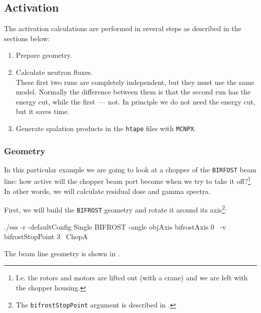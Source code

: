 \subsection{Activation}

The activation calculations are performed in several steps as described in the sections below:
\begin{enumerate}
  \item Prepare geometry.
  \item Calculate neutron fluxes. \\
    These first two runs are completely independent, but they must use the same model. 
    Normally the difference between them is that the second run has the energy cut, while the first~--- not.
    In principle we do not need the energy cut, but it saves time.
  \item Generate spalation products in the {\tt htape} files with {\tt MCNPX}.
\end{enumerate}
\subsubsection{Geometry}
In this particular example we are going to look at a chopper
of the  {\tt BIRFOST} beam line: how active will the chopper beam
port become when we try to take it off?\footnote{I.e. the rotors and motors are lifted out (with a crane) and we are left with the chopper housing.} In other words, we will calculate residual dose and gamma spectra.

First, we will build the {\tt BIFROST} geometry and rotate it around
its axis\footnote{The {\tt bifrostStopPoint} argument is described in .}:

\begin{bash}
./ess -r -defaultConfig Single BIFROST -angle objAxis bifrostAxis 0 \
      -v bifrostStopPoint 3 \
      ChopA
\end{bash}

The beam line geometry is shown in .

